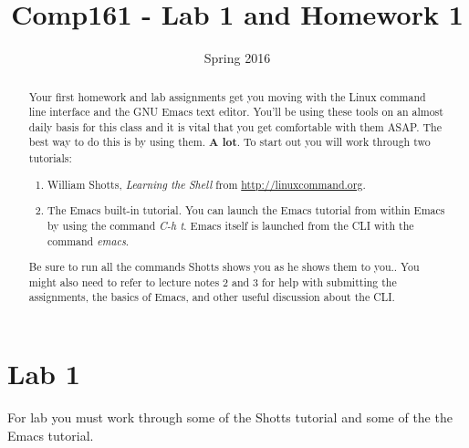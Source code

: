 \documentclass[]{tufte-handout}
\title{Comp161 - Lab 1 and Homework 1}
\author{}
\date{ Spring 2016 }
\begin{document}
\maketitle

\begin{abstract}
Your first homework and lab assignments get you moving with the Linux command line interface and the GNU Emacs text editor.  You'll be using these tools on an almost daily basis for this class and it is vital that you get comfortable with them ASAP. The best way to do this is by using them.  \textbf{A lot}. To start out you will work through two tutorials:
\begin{enumerate}
\item William Shotts, \textit{Learning the Shell} from \url{http://linuxcommand.org}.
\item The Emacs built-in tutorial. You can launch the Emacs tutorial from within Emacs by using the command \textit{C-h t}.  Emacs itself is launched from the CLI with the command \textit{emacs}.
\end{enumerate}
Be sure to run all the commands Shotts shows you as he shows them to you..  You might also need to refer to lecture notes 2 and 3 for help with submitting the assignments, the basics of Emacs, and other useful discussion about the CLI.
\end{abstract}


\section{Lab 1}

For lab you must work through some of the  Shotts tutorial and some of the the Emacs tutorial. 
\end{document}
